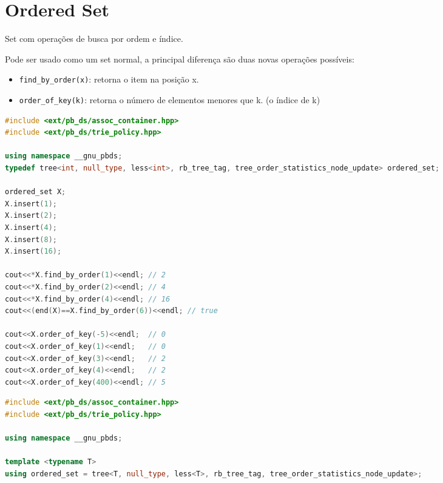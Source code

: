 \documentclass[11pt, a4paper, oneside]{book}
\begin{document}
\hfill

\section{Ordered Set}


Set com operações de busca por ordem e índice.



Pode ser usado como um set normal, a principal diferença são duas novas operações possíveis:



\begin{itemize}
\item \lstinline{find_by_order(x)}: retorna o item na posição x.
\item \lstinline{order_of_key(k)}: retorna o número de elementos menores que k. (o índice de k)
\end{itemize}



\textbf{} 
\begin{lstlisting}[language=C++]
#include <ext/pb_ds/assoc_container.hpp>
#include <ext/pb_ds/trie_policy.hpp>

using namespace __gnu_pbds;
typedef tree<int, null_type, less<int>, rb_tree_tag, tree_order_statistics_node_update> ordered_set;

ordered_set X;
X.insert(1);
X.insert(2);
X.insert(4);
X.insert(8);
X.insert(16);

cout<<*X.find_by_order(1)<<endl; // 2
cout<<*X.find_by_order(2)<<endl; // 4
cout<<*X.find_by_order(4)<<endl; // 16
cout<<(end(X)==X.find_by_order(6))<<endl; // true

cout<<X.order_of_key(-5)<<endl;  // 0
cout<<X.order_of_key(1)<<endl;   // 0
cout<<X.order_of_key(3)<<endl;   // 2
cout<<X.order_of_key(4)<<endl;   // 2
cout<<X.order_of_key(400)<<endl; // 5

\end{lstlisting}

\hfill

\begin{multicols}{2}
\begin{lstlisting}[language=C++]
#include <ext/pb_ds/assoc_container.hpp>
#include <ext/pb_ds/trie_policy.hpp>

using namespace __gnu_pbds;

template <typename T>
using ordered_set = tree<T, null_type, less<T>, rb_tree_tag, tree_order_statistics_node_update>;\end{lstlisting}
\end{multicols}
\end{document}
